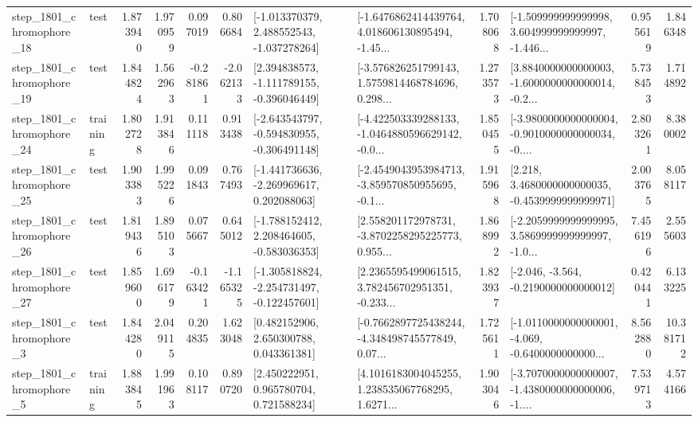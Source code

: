 \begin{tabular}{llrrrrllrlrr}
 step\_1801\_chromophore\_18 &      test &      1.873940 &    1.970959 &      0.097019 &  0.806684 &   [-1.013370379, 2.488552543, -1.037278264] &  [-1.6476862414439764, 4.018606130895494, -1.45... &       1.708068 &  [-1.509999999999998, 3.604999999999997, -1.446... &            0.955619 &          1.846348 \\
 step\_1801\_chromophore\_19 &      test &      1.844824 &    1.562963 &     -0.281861 & -2.062133 &   [2.394838573, -1.111789155, -0.396046449] &  [-3.576826251799143, 1.5759814468784696, 0.298... &       1.273573 &  [3.8840000000000003, -1.6000000000000014, -0.2... &            5.738453 &          1.714892 \\
 step\_1801\_chromophore\_24 &  training &      1.802728 &    1.913846 &      0.111118 &  0.913438 &  [-2.643543797, -0.594830955, -0.306491148] &  [-4.422503339288133, -1.0464880596629142, -0.0... &       1.850455 &  [-3.9800000000000004, -0.9010000000000034, -0.... &            2.803261 &          8.380002 \\
 step\_1801\_chromophore\_25 &      test &      1.903383 &    1.995226 &      0.091843 &  0.767493 &   [-1.441736636, -2.269969617, 0.202088063] &  [-2.4549043953984713, -3.859570850955695, -0.1... &       1.915968 &   [2.218, 3.4680000000000035, -0.4539999999999971] &            2.003765 &          8.058117 \\
 step\_1801\_chromophore\_26 &      test &      1.819436 &    1.895103 &      0.075667 &  0.645012 &   [-1.788152412, 2.208464605, -0.583036353] &  [2.558201172978731, -3.8702258295225773, 0.955... &       1.868992 &  [-2.2059999999999995, 3.5869999999999997, -1.0... &            7.456196 &          2.555603 \\
 step\_1801\_chromophore\_27 &      test &      1.859600 &    1.696179 &     -0.163421 & -1.165325 &  [-1.305818824, -2.254731497, -0.122457601] &  [2.2365595499061515, 3.782456702951351, -0.233... &       1.823937 &              [-2.046, -3.564, -0.2190000000000012] &            0.420441 &          6.133225 \\
  step\_1801\_chromophore\_3 &      test &      1.844280 &    2.049115 &      0.204835 &  1.623048 &     [0.482152906, 2.650300788, 0.043361381] &  [-0.7662897725438244, -4.348498745577849, 0.07... &       1.725611 &  [-1.0110000000000001, -4.069, -0.6400000000000... &            8.562880 &         10.381712 \\
  step\_1801\_chromophore\_5 &  training &      1.883845 &    1.991963 &      0.108117 &  0.890720 &     [2.450222951, 0.965780704, 0.721588234] &  [4.1016183004045255, 1.238535067768295, 1.6271... &       1.903046 &  [-3.7070000000000007, -1.4380000000000006, -1.... &            7.539713 &          4.574166 \\

\end{tabular}

